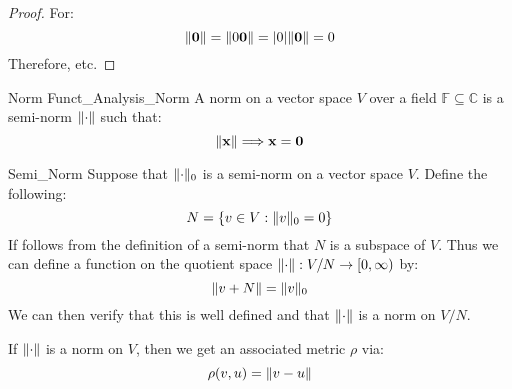         \begin{proof}
            For:
            \begin{equation}
                \lVert\mathbf{0}\rVert
                =\lVert0\mathbf{0}\rVert
                =|0|\lVert\mathbf{0}\rVert=0
            \end{equation}
            Therefore, etc.
        \end{proof}
        \begin{ldefinition}{Norm}
              {Funct_Analysis_Norm}
            A norm on a vector space $V$ over a
            field $\mathbb{F}\subseteq\mathbb{C}$
            is a semi-norm $\lVert\cdot\rVert$ such that:
            \begin{equation}
                \lVert\mathbf{x}\rVert\Longrightarrow\mathbf{x}
                =\mathbf{0}
            \end{equation}
        \end{ldefinition}
        \begin{lexample}{}{Semi_Norm}
            Suppose that $\lVert\cdot\rVert_{0}$ is a semi-norm
            on a vector space $V$. Define the following:
            \begin{equation}
                N=\{v\in{V}:\lVert v\rVert_{0}=0\}
            \end{equation}
            If follows from the definition of a semi-norm that
            $N$ is a subspace of $V$. Thus we can define a
            function on the quotient space
            $\lVert\cdot\rVert:V/N\rightarrow[0,\infty)$ by:
            \begin{equation}
                \lVert v+N\rVert=\lVert v\rVert_{0}
            \end{equation}
            We can then verify that this is well defined and
            that $\lVert\cdot\rVert$ is a norm on $V/N$.
        \end{lexample}
        If $\lVert\cdot\rVert$ is a norm on $V$, then we get an
        associated metric $\rho$ via:
        \begin{equation}
            \rho(v,u)=\lVert v-u\rVert
        \end{equation}
